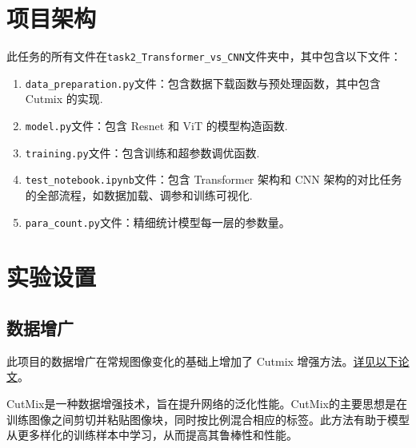 \documentclass[notitlepage,cs4size,punct,oneside]{ctexrep}
\numberwithin{equation}{chapter}
\theoremstyle{mystyle}
\begin{document}
\section{项目架构}
此任务的所有文件在\texttt{task2\_Transformer\_vs\_CNN}文件夹中，其中包含以下文件：
\begin{enumerate}
\item \texttt{data\_preparation.py}文件：包含数据下载函数与预处理函数，其中包含 Cutmix 的实现.
\item \texttt{model.py}文件：包含 Resnet 和 ViT 的模型构造函数.
\item \texttt{training.py}文件：包含训练和超参数调优函数.
\item \texttt{test\_notebook.ipynb}文件：包含 Transformer 架构和 CNN 架构的对比任务的全部流程，如数据加载、调参和训练可视化.
\item \texttt{para\_count.py}文件：精细统计模型每一层的参数量。
\end{enumerate}

\section{实验设置}
\subsection{数据增广}
此项目的数据增广在常规图像变化的基础上增加了 Cutmix 增强方法。\href{http://openaccess.thecvf.com/content_ICCV_2019/papers/Yun_CutMix_Regularization_Strategy_to_Train_Strong_Classifiers_With_Localizable_Features_ICCV_2019_paper.pdf}{详见以下论文}。

CutMix是一种数据增强技术，旨在提升网络的泛化性能。CutMix的主要思想是在训练图像之间剪切并粘贴图像块，同时按比例混合相应的标签。此方法有助于模型从更多样化的训练样本中学习，从而提高其鲁棒性和性能。
\end{document}
